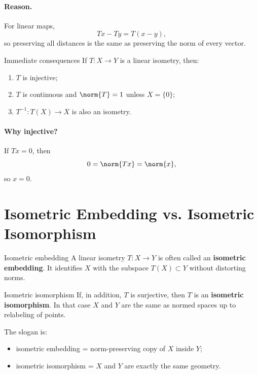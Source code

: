 \documentclass[11pt]{article}
\begin{document}
\paragraph{Reason.}
For linear maps,
\[
Tx-Ty=T(x-y),
\]
so preserving all distances is the same as preserving the norm of every vector.

\begin{thmbox}{Immediate consequences}
If $T:X\to Y$ is a linear isometry, then:
\begin{enumerate}
\item $T$ is injective;
\item $T$ is continuous and $\norm{T}=1$ unless $X=\{0\}$;
\item $T^{-1}:T(X)\to X$ is also an isometry.
\end{enumerate}
\end{thmbox}

\paragraph{Why injective?}
If $Tx=0$, then
\[
0=\norm{Tx}=\norm{x},
\]
so $x=0$.

\section{Isometric Embedding vs. Isometric Isomorphism}

\begin{defbox}{Isometric embedding}
A linear isometry $T:X\to Y$ is often called an \textbf{isometric embedding}. It identifies $X$ with the subspace $T(X)\subset Y$ without distorting norms.
\end{defbox}

\begin{defbox}{Isometric isomorphism}
If, in addition, $T$ is surjective, then $T$ is an \textbf{isometric isomorphism}. In that case $X$ and $Y$ are the same as normed spaces up to relabeling of points.
\end{defbox}

\begin{focusbox}
The slogan is:
\begin{itemize}
\item isometric embedding = norm-preserving copy of $X$ inside $Y$;
\item isometric isomorphism = $X$ and $Y$ are exactly the same geometry.
\end{itemize}
\end{focusbox}
\end{document}
